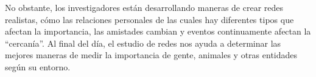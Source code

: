 \documentclass[a4paper, 12pt]{report}
\begin{document}
No obstante, los investigadores están desarrollando maneras de crear redes
realistas, cómo las relaciones personales de las cuales hay diferentes tipos
que afectan la importancia, las amistades cambian y eventos continuamente
afectan la ``cercanía''. Al final del día, el estudio de redes nos ayuda a
determinar las mejores maneras de medir la importancia de gente, animales y
otras entidades según su entorno.

\end{document}
